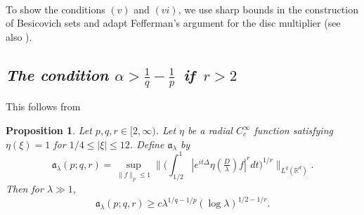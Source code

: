\documentclass[11pt]{amsart}
\newtheorem{proposition}[theorem]{Proposition}
\theoremstyle{definition}
\numberwithin{theorem}{section}
\numberwithin{definition}{section}
\numberwithin{equation}{section}
\newcommand{\Be}{\begin{equation}}
\newcommand{\Ee}{\end{equation}}
\renewcommand{\le}{\leqslant}
\renewcommand{\ge}{\geqslant}
\def\la{\lambda}             \def\La{\Lambda}
\def\fa{{\mathfrak {a}}}
\def\bbR{{\mathbb {R}}}
\renewcommand{\le}{\leqslant}
\renewcommand{\ge}{\geqslant}
\begin{document}
\


To show the conditions $(v)$ and  $(vi)$,  we use sharp bounds in the
construction of  Besicovich sets \cite{keich} and adapt Fefferman's  argument
for the  disc multiplier \cite{F} (see also \cite{BCSS}).




\subsection{\it The condition $\alpha>\frac1q-\frac1p$\, if\, $r>2$}  This follows from

\begin{proposition}\label{kakeyaprop}
Let $p,q,r\in [2,\infty)$. Let $\eta$ be a radial $C_c^\infty$ function
satisfying $\eta(\xi)=1$ for $1/4\le |\xi|\le 12$.
Define $\fa_\la$ by
\Be\label{fapqr}
\fa_\la(p;q,r)=\sup_{\|f\|_p\le 1}
\Big\|\Big(\int_{1/2}^1 |e^{it\Delta} \eta(\tfrac D\la ) f|^r dt\Big)^{1/r}
\Big\|_{L^q(\bbR^d)}.
\Ee
Then for  $\la\gg 1$,
\Be\label{fapqrlowerbd}
 \fa_\la(p;q,r)\ge c \la^{1/q-1/p}(\log \la)^{1/2-1/r}.
\Ee
\end{proposition}
\end{document}
